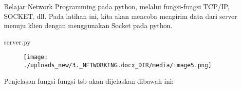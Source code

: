 \documentclass{wileySix}
\begin{document}
Belajar Network Programming pada python, melalui fungsi-fungsi TCP/IP, SOCKET, dll. Pada latihan ini, kita akan mencoba mengirim data dari server menuju klien dengan menggunakan Socket pada python. \par
\noindent 
\begin{myEnumerate}
	\item server.py\end{myEnumerate}
\par
\noindent 
\begin{center}
	
	
	
	\begin{figure}[H]
		\begin{center}
			\texttt{[image: ./uploads\_new/3.\_NETWORKING.docx\_DIR/media/image5.png]}
		\end{center}
	\end{figure}
	
	
	
	
\end{center}\vspace{12pt}
\noindent 
Penjelasan fungsi-fungsi tsb akan dijelaskan dibawah ini: \par
\noindent 
\end{document}
